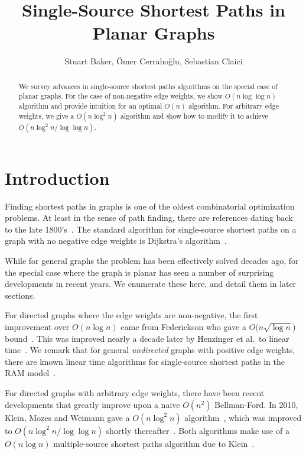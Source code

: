 \documentclass[12pt]{article}
\title{Single-Source Shortest Paths in Planar Graphs}
\author{Stuart Baker, \"{O}mer Cerraho\u{g}lu, Sebastian Claici}
\date{}
\begin{document}
\maketitle

\begin{abstract}
  We survey advances in single-source shortest paths algorithms on the special case of planar graphs. For the case of non-negative edge weights, we show $O(n\log \log n)$ algorithm and provide intuition for an optimal $O(n)$ algorithm. For arbitrary edge weights, we give a $O(n\log^2 n)$ algorithm and show how to modify it to achieve $O(n\log^2 n/\log \log n)$.
\end{abstract}

\section{Introduction}
\label{sec:introduction}

Finding shortest paths in graphs is one of the oldest combinatorial optimization problems. At least in the sense of path finding, there are references dating back to the late 1800's~\cite{wiener1873ueber}. The standard algorithm for single-source shortest paths on a graph with no negative edge weights is Dijkstra's algorithm~\cite{dijkstra1959note}.

While for general graphs the problem has been effectively solved decades ago, for the special case where the graph is planar has seen a number of surprising developments in recent years. We enumerate these here, and detail them in later sections.

For directed graphs where the edge weights are non-negative, the first improvement over $O(n\log n)$ came from Federickson who gave a $O(n \sqrt{\log n}$) bound~\cite{federickson1987fast}. This was improved nearly a decade later by Henzinger et al.\ to linear time~\cite{henzinger1997faster}. We remark that for general \emph{undirected} graphs with positive edge weights, there are known linear time algorithms for single-source shortest paths in the RAM model~\cite{thorup1999undirected}.

For directed graphs with arbitrary edge weights, there have been recent developments that greatly improve upon a naive $O(n^2)$ Bellman-Ford. In 2010, Klein, Mozes and Weimann gave a $O(n \log^2 n)$ algorithm~\cite{klein2010shortest}, which was improved to $O(n \log^2 n / \log \log n)$ shortly thereafter~\cite{mozes2010shortest}. Both algorithms make use of a $O(n \log n)$ multiple-source shortest paths algorithm due to Klein~\cite{klein2005multiple}.
\end{document}
